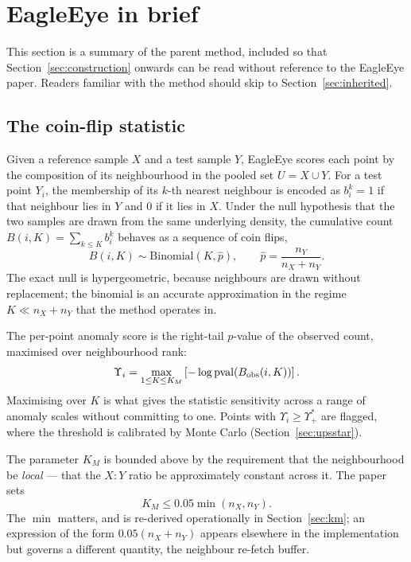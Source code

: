 \documentclass[11pt,a4paper]{article}
\newcommand{\Ups}{\Upsilon}                  %
\newcommand{\phat}{\hat{p}}                  %
\newcommand{\Ups}{\Upsilon}
\newcommand{\phat}{\hat{p}}
\begin{document}
\section{EagleEye in brief}
\label{sec:ee}

This section is a summary of the parent method, included so that Section~\ref{sec:construction}
onwards can be read without reference to the EagleEye paper. Readers familiar with the method
should skip to Section~\ref{sec:inherited}.

\subsection{The coin-flip statistic}

Given a reference sample $X$ and a test sample $Y$, EagleEye scores each point by the composition
of its neighbourhood in the pooled set $U = X \cup Y$. For a test point $Y_i$, the membership of
its $k$-th nearest neighbour is encoded as $b_i^k = 1$ if that neighbour lies in $Y$ and $0$ if it
lies in $X$. Under the null hypothesis that the two samples are drawn from the same underlying
density, the cumulative count $B(i,K) = \sum_{k \le K} b_i^k$ behaves as a sequence of coin flips,
%
\begin{equation}
B(i,K) \sim \mathrm{Binomial}(K, \phat), \qquad \phat = \frac{n_Y}{n_X + n_Y}.
\end{equation}
%
The exact null is hypergeometric, because neighbours are drawn without replacement; the binomial
is an accurate approximation in the regime $K \ll n_X + n_Y$ that the method operates in.

The per-point anomaly score is the right-tail $p$-value of the observed count, maximised over
neighbourhood rank:
%
\begin{equation}
\Ups_i = \max_{1 \le K \le K_M}
         \left[ -\log \mathrm{pval}\!\left(B_{\rm obs}(i,K)\right) \right].
\label{eq:upsilon}
\end{equation}
%
Maximising over $K$ is what gives the statistic sensitivity across a range of anomaly scales
without committing to one. Points with $\Ups_i \ge \Ups^*_+$ are flagged, where the threshold is
calibrated by Monte Carlo (Section~\ref{sec:upsstar}).

The parameter $K_M$ is bounded above by the requirement that the neighbourhood be \emph{local}
--- that the $X\!:\!Y$ ratio be approximately constant across it. The paper sets
%
\begin{equation}
K_M \le 0.05 \min(n_X, n_Y).
\label{eq:locality}
\end{equation}
%
The $\min$ matters, and is re-derived operationally in Section~\ref{sec:km}; an expression of the
form $0.05(n_X + n_Y)$ appears elsewhere in the implementation but governs a different quantity,
the neighbour re-fetch buffer.
\end{document}
